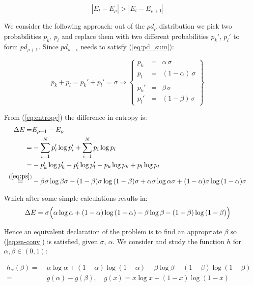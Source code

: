 \documentclass[9pt,a4paper]{article}
\begin{document}
\begin{equation}
|E_t - E_\rho| > |E_t - E_{\rho+1}|
\label{eq:en-conv}
\end{equation}

We consider the following approach: out of the $pd_\rho$ distribution we pick two
probabilities $p_k$, $p_l$ and replace them with two different
probabilities $p_k'$, $p_l'$ to form $pd_{\rho+1}$. Since $pd_{\rho+i}$
needs to satisfy (\ref{eq:pd_sum}):

\begin{equation}
 p_k + p_l = p_k' + p_l' = \sigma  \Rightarrow
 \left\{ \begin{array}{lll}
          p_k &=& \alpha\, \sigma \\
          p_l &=& (1-\alpha )\, \sigma \\
          \\
          p_k' &=& \beta\, \sigma \\
          p_l' &=& (1-\beta)\, \sigma 
 \end{array} \right\}
\label{eq:ps}
\end{equation}


\newcommand{\XLogX}[1]{#1\log{#1}}
From (\ref{eq:entropy}) the difference in entropy is:
\begin{align*}
\Delta E 
 = & E_{\rho+1} - E_{\rho} \\
 = & - \sum_{i=1}^{N}{p_i'} \log{p_i'} + \sum_{i=1}^{N}{p_i} \log{p_i}  \\
 = & -\XLogX{p_k'} -\XLogX{p_l'} + \XLogX{p_k} + \XLogX{p_l} \\
\stackrel{(\ref{eq:ps})}{=} 
   & - \XLogX{\beta\sigma} - \XLogX{(1-\beta)\sigma}  
     + \XLogX{\alpha\sigma} + \XLogX{(1-\alpha)\sigma}   
\end{align*}

Which after some simple calculations results in:
\begin{equation}
\Delta E = \sigma \Bigl( 
                \XLogX{\alpha} + \XLogX{(1-\alpha)}
                - \XLogX{\beta}  - \XLogX{(1-\beta)} 
       \Bigr)
\end{equation}

Hence an equivalent declaration of the problem is to find an appropriate
$\beta$ so (\ref{eq:en-conv}) is satisfied, given $\sigma$, $\alpha$.
We consider and study the function $h$ for $\alpha,\beta \in (0,1)$:

\begin{align*}
h_\alpha(\beta) = \; & \XLogX{\alpha} + \XLogX{(1-\alpha)} - \XLogX{\beta}  - \XLogX{(1-\beta)} \\
                = \; & g(\alpha) - g(\beta), \quad 
                       g(x) = \XLogX{x} + \XLogX{(1-x)}
\end{align*}
\end{document}
